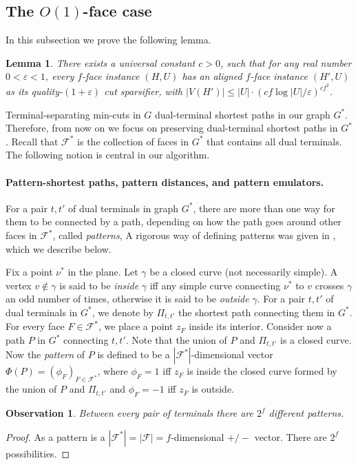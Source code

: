 \documentclass[11pt]{article}
\newtheorem{lemma}[theorem]{Lemma}
\newtheorem{observation}[theorem]{Observation}
\theoremstyle{definition}
\newcommand{\fset}{{\mathcal{F}}}
\newcommand{\eps}{{\varepsilon}}
\newcounter{note}
\newcommand{\pat}{\Phi}
\begin{document}
\subsection{The $O(1)$-face case}

In this subsection we prove the following lemma.

\begin{lemma}
	\label{lem: O(1) face}
	There exists a universal constant $c>0$, such that for any real number $0<\eps<1$, every $f$-face instance $(H,U)$ has an aligned $f$-face instance $(H',U)$ as its quality-$(1+\eps)$ cut sparsifier, with $|V(H')|\le |U|\cdot (cf\log |U|/\eps)^{cf^2}$.
\end{lemma}

Terminal-separating min-cuts in $G$ dual-terminal shortest paths in our graph $G^*$. Therefore, from now on we focus on preserving dual-terminal shortest paths in $G^*$. Recall that $\fset^*$ is the collection of faces in $G^*$ that contains all dual terminals. The following notion is central in our algorithm.


\paragraph{Pattern-shortest paths, pattern distances, and pattern emulators.}
For a pair $t,t'$ of dual terminals in graph $G^*$, there are more than one way for them to be connected by a path, depending on how the path goes around other faces in $\fset^*$, called \emph{patterns},  A rigorous way of defining patterns was given in \cite{krauthgamer2017refined}, which we describe below.

Fix a point $\nu^*$ in the plane.
Let $\gamma$ be a closed curve (not necessarily simple). A vertex $v\notin \gamma$ is said to be \emph{inside} $\gamma$ iff any simple curve connecting $\nu^*$ to $v$ crosses $\gamma$ an odd number of times, otherwise it is said to be \emph{outside} $\gamma$.
For a pair $t,t'$ of dual terminals in $G^*$, we denote by $\Pi_{t,t'}$ the shortest path connecting them in $G^*$.
For every face $F\in \fset^*$, we place a point $z_F$ inside its interior. Consider now a path $P$ in $G^*$ connecting $t,t'$. Note that the union of $P$ and $\Pi_{t,t'}$ is a closed curve. Now the \emph{pattern} of $P$ is defined to be a $|\fset^*|$-dimensional vector $\pat(P)=(\phi_F)_{F\in \fset^*}$, where $\phi_F=1$ iff $z_F$ is inside the closed curve formed by the union of $P$ and $\Pi_{t,t'}$ and $\phi_F=-1$ iff $z_F$ is outside.

\begin{observation}
\label{obs: pattern}
Between every pair of terminals there are $2^{f}$ different patterns.
\end{observation}
\begin{proof}
As a pattern is a $|\fset^*|=|\fset|=f$-dimensional $+/-$ vector. There are $2^f$ possibilities.
\end{proof}
\end{document}
